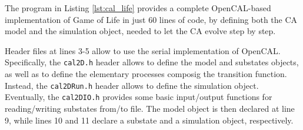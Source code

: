 The program in Listing \ref{lst:cal_life} provides a complete
OpenCAL-based implementation of Game of Life in just 60 lines of code,
by defining both the CA model and the simulation object, needed to let
the CA evolve step by step.

Header files at lines 3-5 allow to use the serial implementation of
OpenCAL. Specifically, the \verb'cal2D.h' header allows to define the
model and substates objects, as well as to define the elementary
processes composig the transition function. Instead, the
\verb'cal2DRun.h' header allows to define the simulation
object. Eventually, the \verb'cal2DIO.h' provides some basic
input/output functions for reading/writing substates from/to file. The
model object is then declared at line 9, while lines 10 and 11 declare
a substate and a simulation object, respectively.

